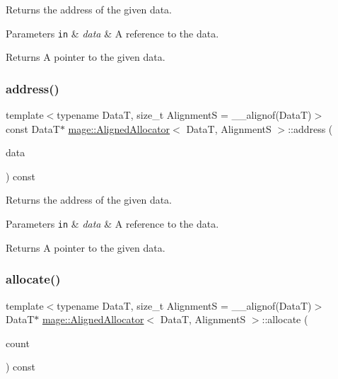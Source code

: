 Returns the address of the given data.


\begin{DoxyParams}[1]{Parameters}
\mbox{\tt in}  & {\em data} & A reference to the data. \\
\hline
\end{DoxyParams}
\begin{DoxyReturn}{Returns}
A pointer to the given data. 
\end{DoxyReturn}
\hypertarget{structmage_1_1_aligned_allocator_afd76c25aa8f6918172c8e0ac8146963a}{}\label{structmage_1_1_aligned_allocator_afd76c25aa8f6918172c8e0ac8146963a} 
\subsubsection{\texorpdfstring{address()}{address()}\hspace{0.1cm}{\footnotesize\ttfamily [2/2]}}
{\footnotesize\ttfamily template$<$typename DataT, size\+\_\+t AlignmentS = \+\_\+\+\_\+alignof(\+Data\+T)$>$ \\
const DataT$\ast$ \hyperlink{structmage_1_1_aligned_allocator}{mage\+::\+Aligned\+Allocator}$<$ DataT, AlignmentS $>$\+::address (\begin{DoxyParamCaption}\item[{const DataT \&}]{data }\end{DoxyParamCaption}) const\hspace{0.3cm}{\ttfamily [noexcept]}}

Returns the address of the given data.


\begin{DoxyParams}[1]{Parameters}
\mbox{\tt in}  & {\em data} & A reference to the data. \\
\hline
\end{DoxyParams}
\begin{DoxyReturn}{Returns}
A pointer to the given data. 
\end{DoxyReturn}
\hypertarget{structmage_1_1_aligned_allocator_aa40b7eb431ac79e6b09bbd9e55906e78}{}\label{structmage_1_1_aligned_allocator_aa40b7eb431ac79e6b09bbd9e55906e78} 
\subsubsection{\texorpdfstring{allocate()}{allocate()}\hspace{0.1cm}{\footnotesize\ttfamily [1/2]}}
{\footnotesize\ttfamily template$<$typename DataT, size\+\_\+t AlignmentS = \+\_\+\+\_\+alignof(\+Data\+T)$>$ \\
DataT$\ast$ \hyperlink{structmage_1_1_aligned_allocator}{mage\+::\+Aligned\+Allocator}$<$ DataT, AlignmentS $>$\+::allocate (\begin{DoxyParamCaption}\item[{size\+\_\+t}]{count }\end{DoxyParamCaption}) const}

